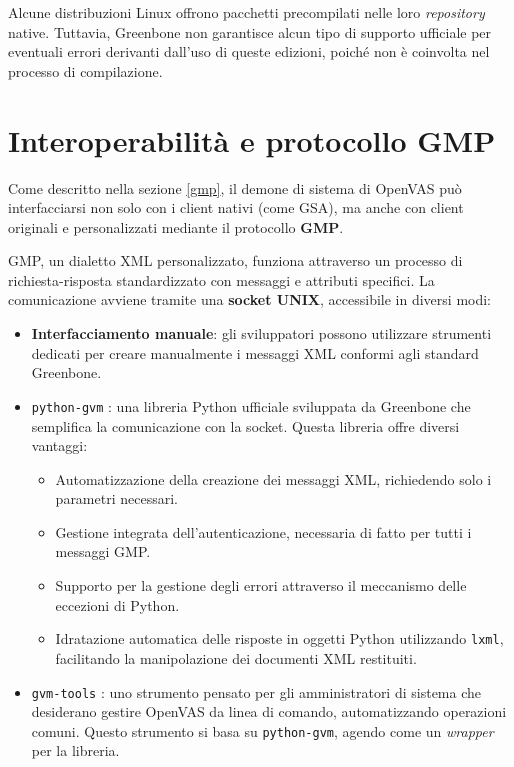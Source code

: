 Alcune distribuzioni Linux offrono pacchetti precompilati nelle loro \emph{repository} native. Tuttavia, Greenbone non garantisce alcun tipo di supporto ufficiale per eventuali errori derivanti dall'uso di queste edizioni, poiché non è coinvolta nel processo di compilazione.

\section{Interoperabilità e protocollo GMP}
\label{libraries}
Come descritto nella sezione \ref{gmp}, il demone di sistema di OpenVAS può interfacciarsi non solo con i client nativi (come GSA), ma anche con client originali e personalizzati mediante il protocollo \textbf{GMP}.

GMP, un dialetto XML personalizzato, funziona attraverso un processo di richiesta-risposta standardizzato con messaggi e attributi specifici. La comunicazione avviene tramite una \textbf{socket UNIX}, accessibile in diversi modi:

\begin{itemize}
    \item \textbf{Interfacciamento manuale}: gli sviluppatori possono utilizzare strumenti dedicati per creare manualmente i messaggi XML conformi agli standard Greenbone.

    \item \texttt{python-gvm} \cite{python-gvm}: una libreria Python ufficiale sviluppata da Greenbone che semplifica la comunicazione con la socket. Questa libreria offre diversi vantaggi:
    \begin{itemize}
        \item Automatizzazione della creazione dei messaggi XML, richiedendo solo i parametri necessari.
        \item Gestione integrata dell'autenticazione, necessaria di fatto per tutti i messaggi GMP.
        \item Supporto per la gestione degli errori attraverso il meccanismo delle eccezioni di Python.
        \item Idratazione automatica delle risposte in oggetti Python utilizzando \texttt{lxml}, facilitando la manipolazione dei documenti XML restituiti.
    \end{itemize}

    \item \texttt{gvm-tools} \cite{gvm-tools}: uno strumento pensato per gli amministratori di sistema che desiderano gestire OpenVAS da linea di comando, automatizzando operazioni comuni. Questo strumento si basa su \texttt{python-gvm}, agendo come un \emph{wrapper} per la libreria.
\end{itemize}

